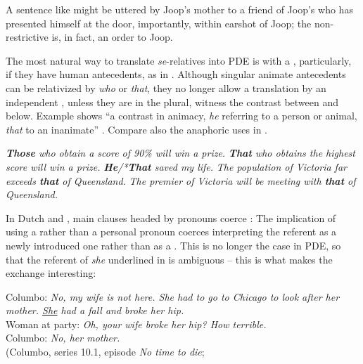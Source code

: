 \documentclass[output=paper,colorlinks,citecolor=brown]{langscibook}
\begin{document}
A sentence like  might be uttered by Joop's mother to a friend of Joop's who has presented himself at the door, importantly, within earshot of Joop; the non-restrictive  is, in fact, an order to Joop.

The most natural way to translate \textit{se}{}-relatives into PDE is with a , particularly, if they have human antecedents, as in . Although singular animate antecedents can be relativized by \textit{who} or \textit{that}, they no longer allow a translation by an independent , unless they are in the plural, witness the contrast between  and  below. Example  shows “a contrast in animacy, \textit{he} referring to a person or animal, \textit{that} to an inanimate” \citep[1504--1505]{HuddlestonPullum2002}. Compare also the anaphoric uses in .


 \ea\label{ex:los:9}
\ea \label{ex:los:9a}
{\itshape \textbf{Those} who obtain a score of 90\% will win a prize.}
\ex\label{ex:los:9b}{
\itshape *\textbf{That} who obtains the highest score will win a prize.}
\ex \label{ex:los:9c}
{\itshape \textbf{He}/*\textbf{That} saved my life.}
\ex \label{ex:los:9d}
{\itshape The population of Victoria far exceeds \textbf{that} of Queensland.}
\ex \label{ex:los:9e}{
\itshape *The premier of Victoria will be meeting with \textbf{that} of Queensland.}\\ \hfill \citep[1504, their (3) i--v]{HuddlestonPullum2002} 
\z
\z

In Dutch and , main clauses headed by  pronouns coerce  \citep{Comrie1997}: The implication of using a  rather than a personal pronoun coerces interpreting the referent as a newly introduced one rather than as a . This is no longer the case in PDE, so that the referent of \textit{she} underlined in  is ambiguous – this is what makes the exchange interesting: 

\ea\label{ex:los:10}
Columbo: {\itshape No, my wife is not here. She had to go to Chicago to look after her mother. \underline{She} had a fall and broke her hip.}\\ Woman at party: {\itshape Oh, your wife broke her hip? How terrible.}\\ Columbo: {\itshape No, her mother.} \\
\hfill (Columbo, series 10.1, episode \textit{No time to die}; \\ \hfill \citep[134]{LosvanKemenade2018}
\z
\end{document}
